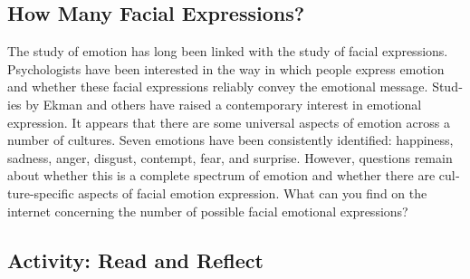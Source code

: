 \documentclass[
]{book}
\begin{document}
\hypertarget{how-many-facial-expressions}{%
\subsection*{How Many Facial Expressions?}\label{how-many-facial-expressions}}

The study of emotion has long been linked with the study of facial expressions. Psychologists have been interested in the way in which people express emotion and whether these facial expressions reliably convey the emotional message. Stud­ies by Ekman and others have raised a contemporary interest in emotional expression. It appears that there are some universal aspects of emotion across a number of cul­tures. Seven emotions have been consistently identified: happi­ness, sadness, anger, disgust, contempt, fear, and surprise. However, questions remain about whether this is a complete spectrum of emotion and whether there are cul­ture-specific aspects of facial emotion expression. What can you find on the internet concerning the number of possible facial emotional expressions?

\hypertarget{activity-read-and-reflect-12}{%
\subsection*{Activity: Read and Reflect}\label{activity-read-and-reflect-12}}
\end{document}
